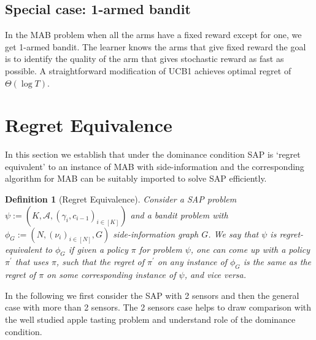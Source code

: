\documentclass{article}
\newtheorem{definition}{Definition}
\begin{document}
\subsection{Special case: 1-armed bandit}
In the MAB problem when all the arms have a fixed reward except for one, we get 1-armed bandit. 
The learner knows the arms that give fixed reward the goal is to identify the quality of the arm that gives stochastic reward as fast as possible. A straightforward modification of UCB1 achieves optimal regret of $\Theta(\log T)$.
  
 \section{Regret Equivalence}
In this section we establish that under the dominance condition SAP is `regret equivalent' to an instance of MAB with side-information and the corresponding algorithm for MAB can be suitably imported to solve SAP efficiently.   
 \noindent
\begin{definition}[Regret Equivalence]
	Consider a SAP problem $\psi:=(K, \mathcal{A}, (\gamma_i,c_{i-1})_{i\in [K]})$ and a bandit problem with $\phi_G:=(N, (\nu_i)_{i \in [N]},G)$ side-information graph $G$. We say that $\psi$ is regret-equivalent to $\phi_G$ if given a policy $\pi$ for problem $\psi$, one can come up with a policy $\pi^\prime$ that uses $\pi$, such that the regret of $\pi^\prime$ on any instance of $\phi_G$ is the same as the regret of $\pi$ on some corresponding instance of $\psi$, and vice versa. 
\end{definition}	
In the following we first consider the SAP with 2 sensors and then the general case with more than 2 sensors. The 2 sensors case helps to draw comparison with the well studied apple tasting problem and understand role of the dominance condition. 
\end{document}
